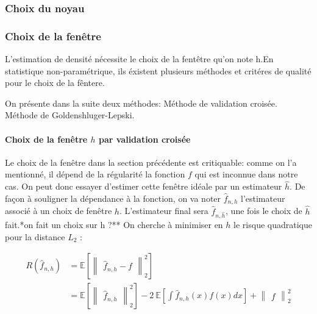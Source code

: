 \documentclass[
]{article}
\begin{document}
\subsubsection{Choix du noyau}

\subsubsection{Choix de la fenêtre}

L'estimation de densité nécessite le choix de la fentêtre qu'on note
h.\newline En statistique non-paramétrique, ils éxistent plusieurs
méthodes et critéres de qualité pour le choix de la fêntere.\newline

On présente dans la suite deux méthodes:\newline \hspace*{0.5cm} Méthode
de validation croisée.\newline \hspace*{0.5cm} Méthode de
Goldenshluger-Lepski.\newline

\paragraph{Choix de la fenêtre $h$ par validation croisée}

Le choix de la fenêtre dans la section précédente est critiquable: comme
on l'a mentionné, il dépend de la régularité la fonction \(f\) qui est
inconnue dans notre cas. On peut donc essayer d'estimer cette fenêtre
idéale par un estimateur \(\hat{h}\). De façon à souligner la dépendance
à la fonction, on va noter \(\hat{f}_{n,h}\) l'estimateur associé à un
choix de fenêtre \(h\). L'estimateur final sera \(\hat{f}_{n,\hat{h}}\),
une fois le choix de \(\hat{h}\) fait.\newline       **on fait un choix
sur h ?** On cherche à minimiser en \(h\) le risque quadratique pour la
distance \(L_2\) :

\[
\begin{aligned}
R(\hat {f}_{n,h})&=\mathbb{E}[\begin{Vmatrix}\hat {f}_{n,h}-f\end{Vmatrix}_2^2]\\        
&= \mathbb{E}[\begin{Vmatrix}\hat {f}_{n,h}\end{Vmatrix}_2^2] -2~\mathbb{E}[\int \hat {f}_{n,h}(x)f(x)dx] +\begin{Vmatrix}f\end{Vmatrix}_2^2
\end{aligned}
\]
\end{document}
